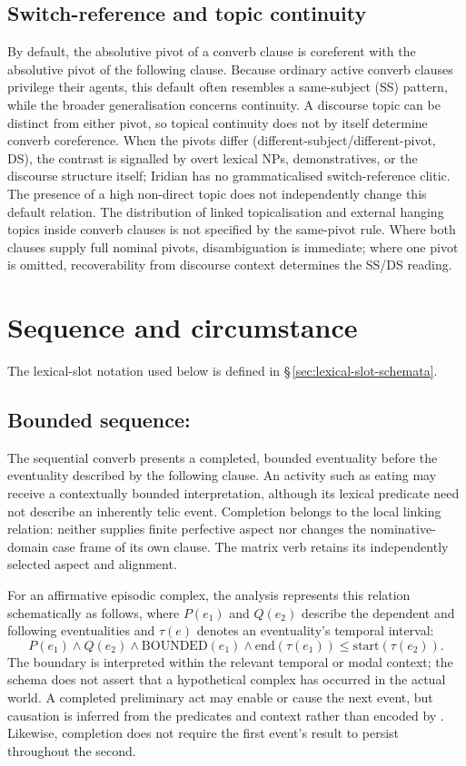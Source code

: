 \subsection{Switch-reference and topic continuity}\label{sec:switch-reference}

By default, the absolutive pivot of a converb clause is coreferent with the
absolutive pivot of the following clause. Because ordinary active converb
clauses privilege their agents, this default often resembles a same-subject
(SS) pattern, while the broader generalisation concerns 
 continuity. A discourse topic can be distinct from either pivot, so topical
 continuity does not by itself determine converb coreference. When
the pivots differ (different-subject/different-pivot, DS), the contrast is
signalled by overt lexical NPs, demonstratives, or the discourse structure
itself; Iridian has no grammaticalised switch-reference clitic. The presence of a
high non-direct topic does not independently change this default relation.
The distribution of linked topicalisation and external hanging topics inside
converb clauses is not specified by the same-pivot rule. Where both
clauses supply full nominal pivots, disambiguation is immediate; where one pivot
is omitted, recoverability from discourse context determines the SS/DS reading.

\section{Sequence and circumstance}\label{sec:sequential}

The lexical-slot notation used below is defined in
§\,\ref{sec:lexical-slot-schemata}.

\subsection{Bounded sequence: }

The sequential converb  presents a completed, bounded eventuality
before the eventuality described by the following clause. An activity such as
eating may receive a contextually bounded interpretation, although its lexical
predicate need not describe an inherently telic event. Completion belongs to the
local linking relation:  neither supplies finite perfective aspect nor
changes the nominative-domain case frame of its own clause. The matrix verb
retains its independently selected aspect and alignment.

For an affirmative episodic complex, the analysis represents this relation
schematically as follows, where $P(e_1)$ and $Q(e_2)$ describe the dependent and
following eventualities and $\tau(e)$ denotes an eventuality's temporal interval:
\[
P(e_1)\land Q(e_2)\land \mathrm{BOUNDED}(e_1)
\land \mathrm{end}(\tau(e_1))\leq\mathrm{start}(\tau(e_2)).
\]
The boundary is interpreted within the relevant temporal or modal context;
the schema does not assert that a hypothetical complex has occurred in the
actual world. A completed preliminary act may enable or cause the next event,
but causation is inferred from the predicates and context rather than encoded
by . Likewise, completion does not require the first event's result to
persist throughout the second.

